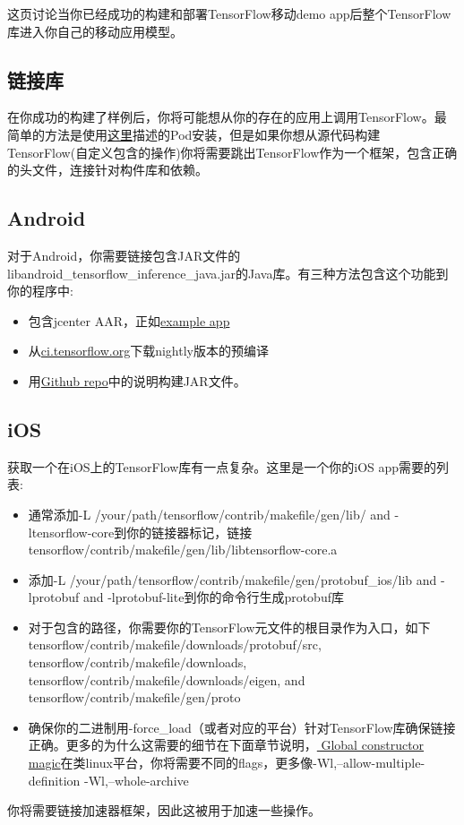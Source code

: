 这页讨论当你已经成功的构建和部署TensorFlow移动demo app后整个TensorFlow库进入你自己的移动应用模型。
\subsection{链接库}
在你成功的构建了样例后，你将可能想从你的存在的应用上调用TensorFlow。最简单的方法是使用\href{https://www.tensorflow.org/mobile/ios_build?hl=zh-cn#using_cocoapods}{这里}描述的Pod安装，但是如果你想从源代码构建TensorFlow(自定义包含的操作)你将需要跳出TensorFlow作为一个框架，包含正确的头文件，连接针对构件库和依赖。
\subsection{Android}
对于Android，你需要链接包含JAR文件的libandroid\_tensorflow\_inference\_java.jar的Java库。有三种方法包含这个功能到你的程序中:
\begin{itemize}
\item 包含jcenter AAR，正如\href{https://github.com/googlecodelabs/tensorflow-for-poets-2/blob/master/android/build.gradle#L59-L65}{example app}
\item 从\href{http://ci.tensorflow.org/view/Nightly/job/nightly-android/lastSuccessfulBuild/artifact/out/?hl=zh-cn}{ci.tensorflow.org}下载nightly版本的预编译
\item 用\href{https://github.com/tensorflow/tensorflow/tree/master/tensorflow/contrib/android}{Github repo}中的说明构建JAR文件。
\end{itemize}
\subsection{iOS}

获取一个在iOS上的TensorFlow库有一点复杂。这里是一个你的iOS app需要的列表:
\begin{itemize}
\item 通常添加-L /your/path/tensorflow/contrib/makefile/gen/lib/ and -ltensorflow-core到你的链接器标记，链接 tensorflow/contrib/makefile/gen/lib/libtensorflow-core.a
\item 添加-L /your/path/tensorflow/contrib/makefile/gen/protobuf\_ios/lib and -lprotobuf and -lprotobuf-lite到你的命令行生成protobuf库
\item 对于包含的路径，你需要你的TensorFlow元文件的根目录作为入口，如下tensorflow/contrib/makefile/downloads/protobuf/src, tensorflow/contrib/makefile/downloads, tensorflow/contrib/makefile/downloads/eigen, and tensorflow/contrib/makefile/gen/proto 
\item 确保你的二进制用-force\_load（或者对应的平台）针对TensorFlow库确保链接正确。更多的为什么这需要的细节在下面章节说明，\href{https://www.tensorflow.org/mobile/linking_libs?hl=zh-cn#global_constructor_magic}{ Global constructor magic}在类linux平台，你将需要不同的flags，更多像-Wl,--allow-multiple-definition -Wl,--whole-archive
\end{itemize}
你将需要链接加速器框架，因此这被用于加速一些操作。
